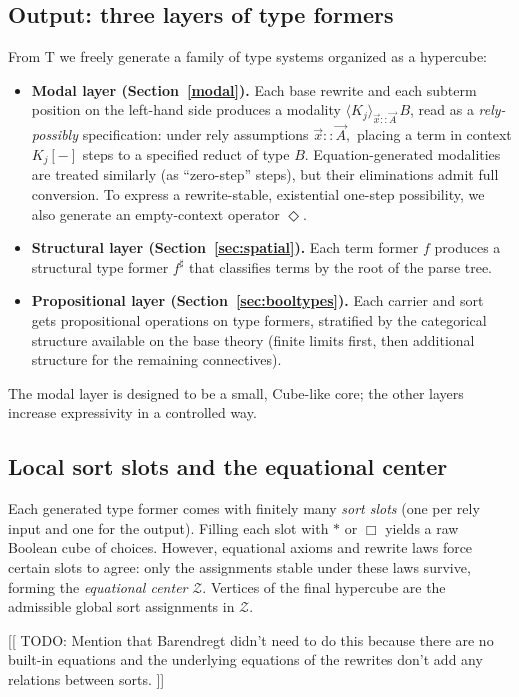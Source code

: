 \documentclass[11pt]{article}
\theoremstyle{definition}
\theoremstyle{plain}
\theoremstyle{remark}
\theoremstyle{plain}
\newcommand{\angles}[3]{\langle #1 \rangle_{#2}\,#3}
\newcommand{\Boxsort}{\Box}
\newcommand{\astsort}{\ast}
\newcommand{\mrm}[1]{\mathrm{#1}}
\newcommand{\T}{\mrm{T}}
\begin{document}
\subsection{Output: three layers of type formers}
From $\T$ we freely generate a family of type systems organized as a hypercube:
\begin{itemize}[leftmargin=2em]
  \item \textbf{Modal layer (Section~\ref{modal}).}
    Each base rewrite and each subterm position on the left-hand side produces a modality
    $\angles{K_j}{\vec{x}::\vec{A}}{B}$,
    read as a \emph{rely-possibly} specification: under rely assumptions $\vec x::\vec A,$ placing a term in context $K_j[-]$ steps to a specified reduct of type $B$.
    Equation-generated modalities are treated similarly (as ``zero-step'' steps), but their eliminations admit full conversion.
    To express a rewrite-stable, existential one-step possibility, we also generate an empty-context operator $\Diamond$.
  \item \textbf{Structural layer (Section~\ref{sec:spatial}).}
    Each term former $f$ produces a structural type former $f^\sharp$ that classifies terms by the root of the parse tree.
  \item \textbf{Propositional layer (Section~\ref{sec:booltypes}).}
    Each carrier and sort gets propositional operations on type formers, stratified by the categorical structure available on the base theory (finite limits first, then additional structure for the remaining connectives).
\end{itemize}
The modal layer is designed to be a small, Cube-like core; the other layers increase expressivity in a controlled way.

\subsection{Local sort slots and the equational center}
Each generated type former comes with finitely many \emph{sort slots} (one per rely input and one for the output).
Filling each slot with $\astsort$ or $\Boxsort$ yields a raw Boolean cube of choices.
However, equational axioms and rewrite laws force certain slots to agree: only the assignments stable under these laws survive, forming the \emph{equational center} $\mathcal{Z}$.
Vertices of the final hypercube are the admissible global sort assignments in $\mathcal{Z}$.

[[ TODO: Mention that Barendregt didn't need to do this because there are no built-in equations and the underlying equations of the rewrites don't add any relations between sorts. ]]
\end{document}
